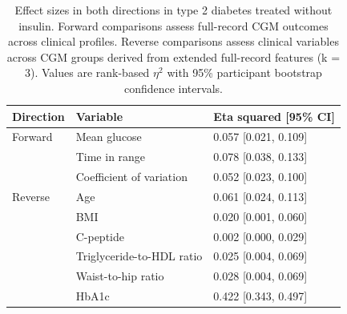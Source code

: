 \begin{table}[htbp]
\centering
\footnotesize
\caption{Effect sizes in both directions in type 2 diabetes treated without insulin. Forward comparisons assess full-record CGM outcomes across clinical profiles. Reverse comparisons assess clinical variables across CGM groups derived from extended full-record features (k = 3). Values are rank-based $\eta^2$ with 95\% participant bootstrap confidence intervals.}
\label{tab:bidirectional}
\begin{tabular}{lll}
\toprule
Direction & Variable & Eta squared [95\% CI] \\
\midrule
Forward & Mean glucose & 0.057 [0.021, 0.109] \\
 & Time in range & 0.078 [0.038, 0.133] \\
 & Coefficient of variation & 0.052 [0.023, 0.100] \\
Reverse & Age & 0.061 [0.024, 0.113] \\
 & BMI & 0.020 [0.001, 0.060] \\
 & C-peptide & 0.002 [0.000, 0.029] \\
 & Triglyceride-to-HDL ratio & 0.025 [0.004, 0.069] \\
 & Waist-to-hip ratio & 0.028 [0.004, 0.069] \\
 & HbA1c & 0.422 [0.343, 0.497] \\
\bottomrule
\end{tabular}
\end{table}
